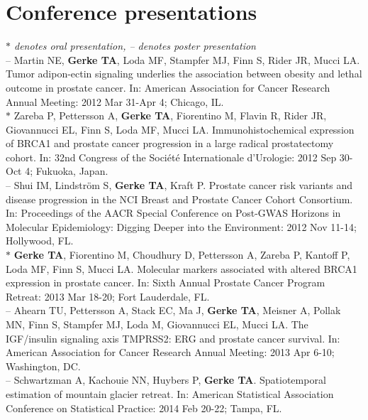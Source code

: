 \documentclass[11pt, a4paper]{article} %
\begin{document}
\section*{Conference presentations}
\vspace{-.3cm}
{\footnotesize\emph{$*$ denotes oral presentation, -- denotes poster presentation}}\\

-- Martin NE, {\bf Gerke TA}, Loda MF, Stampfer MJ, Finn S, Rider JR, Mucci LA. Tumor adipon-ectin signaling underlies the association between obesity and lethal outcome in prostate cancer. In: American Association for Cancer Research Annual Meeting: 2012 Mar 31-Apr 4; Chicago, IL.\\

$*$ Zareba P, Pettersson A, {\bf Gerke TA}, Fiorentino M, Flavin R, Rider JR, Giovannucci EL, Finn S, Loda MF, Mucci LA. Immunohistochemical expression of BRCA1 and prostate cancer progression in  a large radical prostatectomy cohort. In: 32nd Congress of the Soci\'{e}t\'{e} Internationale d'Urologie: 2012 Sep 30-Oct 4; Fukuoka, Japan.\\

-- Shui IM, Lindstr\"{o}m S, {\bf Gerke TA}, Kraft P. Prostate cancer risk variants and disease progression in the NCI Breast and Prostate Cancer Cohort Consortium. In: Proceedings of the AACR Special Conference on Post-GWAS Horizons in Molecular Epidemiology: Digging Deeper into the Environment: 2012 Nov 11-14; Hollywood, FL.\\

$*$ {\bf Gerke TA}, Fiorentino M, Choudhury D, Pettersson A, Zareba P, Kantoff P, Loda MF, Finn S, Mucci LA. Molecular markers associated with altered BRCA1 expression in prostate cancer. In: Sixth Annual Prostate Cancer Program Retreat: 2013 Mar 18-20; Fort Lauderdale, FL.\\

-- Ahearn TU, Pettersson A, Stack EC, Ma J, {\bf Gerke TA}, Meisner A, Pollak MN, Finn S, Stampfer MJ, Loda M, Giovannucci EL, Mucci LA.  The IGF/insulin signaling axis TMPRSS2: ERG and prostate cancer survival.  In: American Association for Cancer Research Annual Meeting: 2013 Apr 6-10; Washington, DC.\\

-- Schwartzman A, Kachouie NN, Huybers P, {\bf Gerke TA}. Spatiotemporal estimation of mountain glacier retreat. In: American Statistical Association Conference on Statistical Practice: 2014 Feb 20-22; Tampa, FL.\\
\end{document}
